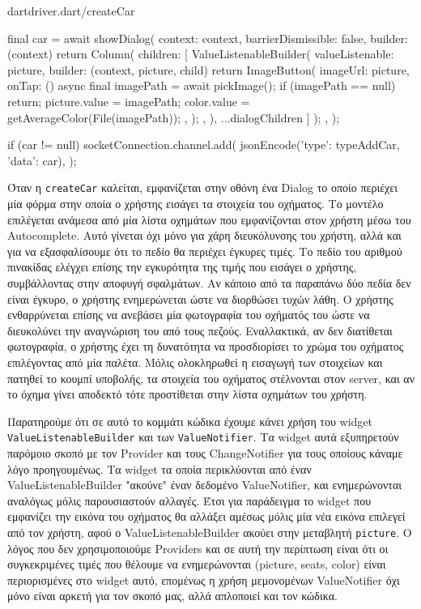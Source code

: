 \documentclass[../thesis.tex]{subfiles}
\begin{document}
\begin{codeblock}{dart}{driver.dart/createCar}
{    final car = await showDialog(
      context: context,
      barrierDismissible: false,
      builder: (context) {
        return Column(
          children: [
            ValueListenableBuilder(
              valueListenable: picture,
              builder: (context, picture, child) {
                return ImageButton(
                  imageUrl: picture,
                  onTap: () async {
                    final imagePath = await pickImage();
                    if (imagePath == null) return;
                    picture.value = imagePath;
                    color.value = getAverageColor(File(imagePath));
                  },
                );
              },
            ),
          ...dialogChildren
          ]
        );
      },
    );

    if (car != null) {
      socketConnection.channel.add(
        jsonEncode({'type': typeAddCar, 'data': car}),
      );
    }
  }
\end{codeblock}

Όταν η \texttt{createCar} καλείται, εμφανίζεται στην οθόνη ένα Dialog το οποίο περιέχει μία φόρμα στην οποία ο χρήστης εισάγει τα στοιχεία του οχήματος.
Το μοντέλο επιλέγεται ανάμεσα από μία λίστα οχημάτων που εμφανίζονται στον χρήστη μέσω του Autocomplete.
Αυτό γίνεται όχι μόνο για χάρη διευκόλυνσης του χρήστη, αλλά και για να εξασφαλίσουμε ότι το πεδίο θα περιέχει έγκυρες τιμές.
Το πεδίο του αριθμού πινακίδας ελέγχει επίσης την εγκυρότητα της τιμής που εισάγει ο χρήστης, συμβάλλοντας στην αποφυγή σφαλμάτων.
Αν κάποιο από τα παραπάνω δύο πεδία δεν είναι έγκυρο, ο χρήστης ενημερώνεται ώστε να διορθώσει τυχών λάθη.
Ο χρήστης ενθαρρύνεται επίσης να ανεβάσει μία φωτογραφία του οχήματός του ώστε να διευκολύνει την αναγνώριση του από τους πεζούς.
Εναλλακτικά, αν δεν διατίθεται φωτογραφία, ο χρήστης έχει τη δυνατότητα να προσδιορίσει το χρώμα του οχήματος επιλέγοντας από μία παλέτα.
Μόλις ολοκληρωθεί η εισαγωγή των στοιχείων και πατηθεί το κουμπί υποβολής, τα στοιχεία του οχήματος στέλνονται στον server, και αν το όχημα γίνει αποδεκτό τότε προστίθεται στην λίστα οχημάτων του χρήστη.

Παρατηρούμε ότι σε αυτό το κομμάτι κώδικα έχουμε κάνει χρήση του widget \texttt{ValueListenableBuilder} και των \texttt{ValueNotifier}.
Τα widget αυτά εξυπηρετούν παρόμοιο σκοπό με τον Provider και τους ChangeNotifier για τους οποίους κάναμε λόγο προηγουμένως.
Τα widget τα οποία περικλύονται από έναν ValueListenableBuilder "ακούνε" έναν δεδομένο ValueNotifier, και ενημερώνονται αναλόγως μόλις παρουσιαστούν αλλαγές.
Έτσι για παράδειγμα το widget που εμφανίζει την εικόνα του οχήματος θα αλλάξει αμέσως μόλις μία νέα εικόνα επιλεγεί από τον χρήστη, αφού ο ValueListenableBuilder ακούει στην μεταβλητή \texttt{picture}.
Ο λόγος που δεν χρησιμοποιούμε Providers και σε αυτή την περίπτωση είναι ότι οι συγκεκριμένες τιμές που θέλουμε να ενημερώνονται (picture, seats, color) είναι περιορισμένες στο widget αυτό, επομένως η χρήση μεμονομένων ValueNotifier όχι μόνο είναι αρκετή για τον σκοπό μας, αλλά απλοποιεί και τον κώδικα.
\end{document}
